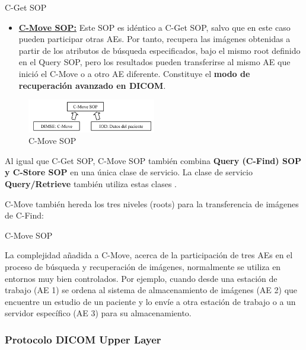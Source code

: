 \begin{table}[hp]
\centering{
\small
}
\caption{C-Get SOP}
\label{tab:cgetSOP}
\end{table}

\begin{itemize}
\item \textbf{\underline{C-Move SOP:}} Este SOP es idéntico a C-Get SOP, salvo que en este caso pueden participar otras AEs. Por tanto, recupera las imágenes obtenidas a partir de los atributos de búsqueda especificados, bajo el mismo root definido en el Query SOP, pero los resultados pueden transferirse al mismo AE que inició el C-Move o a otro AE diferente. Constituye el \textbf{modo de recuperación avanzado en \acs{DICOM}}.
\end{itemize}

\begin{figure}[!h]
\begin{center}
\includegraphics[width=0.5\textwidth]{images/cmoveSOP.png}
\caption{C-Move SOP}
\label{fig:cmoveSOP}
\end{center}
\end{figure}

Al igual que C-Get SOP, C-Move SOP también combina \textbf{Query (C-Find) SOP y C-Store SOP} en una única clase de servicio. La clase de servicio \textbf{Query/Retrieve} también utiliza estas clases \cite{15}.

C-Move también hereda los tres niveles (roots) para la transferencia de imágenes de C-Find:

\begin{table}[hp]
\centering{
\small
}
\caption{C-Move SOP}
\label{tab:cmoveSOP}
\end{table}

La complejidad añadida a C-Move, acerca de la participación de tres AEs en el proceso de búsqueda y recuperación de imágenes, normalmente se utiliza en entornos muy bien controlados. Por ejemplo, cuando desde una estación de trabajo (AE 1) se ordena al sistema de almacenamiento de imágenes (AE 2) que encuentre un estudio de un paciente y lo envíe a otra estación de trabajo o a un servidor específico (AE 3) para su almacenamiento.

\subsubsection{Protocolo \acs{DICOM} Upper Layer}

